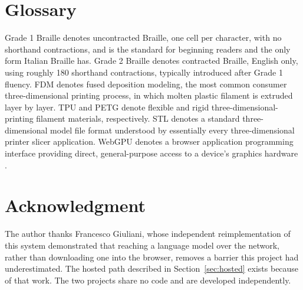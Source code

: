 \documentclass[conference]{IEEEtran}
\begin{document}
\section{Glossary}

Grade 1 Braille denotes uncontracted Braille, one cell per character, with no shorthand contractions, and is the standard for beginning readers and the only form Italian Braille has. Grade 2 Braille denotes contracted Braille, English only, using roughly 180 shorthand contractions, typically introduced after Grade 1 fluency. FDM denotes fused deposition modeling, the most common consumer three-dimensional printing process, in which molten plastic filament is extruded layer by layer. TPU and PETG denote flexible and rigid three-dimensional-printing filament materials, respectively. STL denotes a standard three-dimensional model file format understood by essentially every three-dimensional printer slicer application. WebGPU denotes a browser application programming interface providing direct, general-purpose access to a device's graphics hardware \cite{w3cwebgpu}.

\section*{Acknowledgment}

The author thanks Francesco Giuliani, whose independent reimplementation of this system \cite{tattodev} demonstrated that reaching a language model over the network, rather than downloading one into the browser, removes a barrier this project had underestimated. The hosted path described in Section~\ref{sec:hosted} exists because of that work. The two projects share no code and are developed independently.
\end{document}
